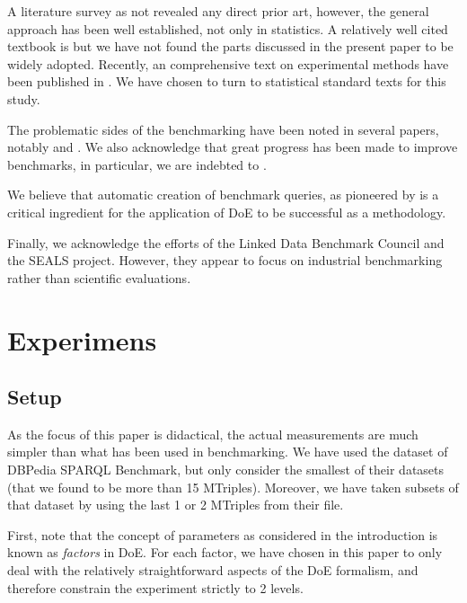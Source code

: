 \documentclass{article}
\begin{document}
A literature survey as not revealed any direct prior art, however, the
general approach has been well established, not only in statistics. A
relatively well cited textbook is \cite{citeulike:5190414} but we have
not found the parts discussed in the present paper to be widely
adopted. Recently, an comprehensive text on experimental methods have
been published in
\cite{Springer-2010-Experimental-Methods-for-the-Analysis-of-Optimization-Algorithms}. 
We have chosen to turn to statistical standard texts
\cite{wu2009experiments} for this study.

The problematic sides of the benchmarking have been noted in several
papers, notably \cite{Duan:2011:AOC:1989323.1989340} and
\cite{MontoyaVCRA12}. We also acknowledge that great
progress has been made to improve benchmarks, in particular, we are
indebted to \cite{mxro:Morsey2011DBpedia}. 

We believe that automatic creation of benchmark queries, as
pioneered by \cite{goerlitz2012splodge} is a critical ingredient for
the application of DoE to be successful as a methodology.

Finally, we acknowledge the efforts of the Linked Data Benchmark
Council and the SEALS project. However, they appear to focus on
industrial benchmarking rather than scientific evaluations. 

\section{Experimens}

\subsection{Setup}

As the focus of this paper is didactical, the actual measurements are
much simpler than what has been used in benchmarking. We have used the
dataset of DBPedia SPARQL Benchmark\cite{mxro:Morsey2011DBpedia}, but only consider the
smallest of their datasets (that we found to be more than 15
MTriples). Moreover, we have taken subsets of that dataset by using
the last 1 or 2 MTriples from their file.

First, note that the concept of parameters as considered in the
introduction is known as \emph{factors} in DoE. For each factor, we
have chosen in this paper to only deal with the relatively
straightforward aspects of the DoE formalism, and therefore 
constrain the experiment strictly to 2 levels.
\end{document}
